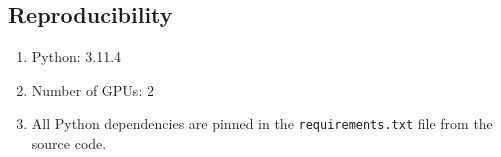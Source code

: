 \documentclass{article}
\begin{document}
\begin{appendices}
    \section{Reproducibility}
    \begin{enumerate}
        \item Python: 3.11.4

        \item Number of GPUs: 2
        
        \item All Python dependencies are pinned in the \texttt{requirements.txt} file from the source code. 
    \end{enumerate}
\end{appendices}



\end{document}
